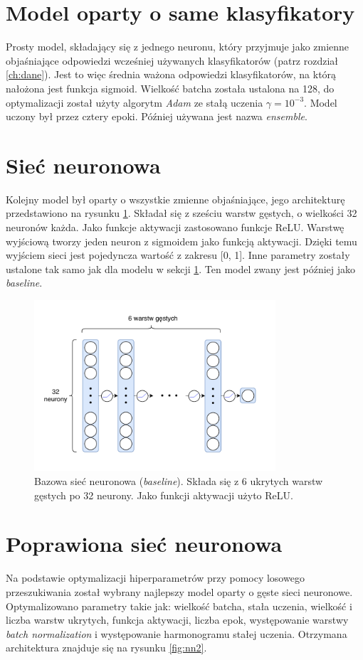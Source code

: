 \documentclass{pracalicmgr}
\begin{document}
	\section{Model oparty o same klasyfikatory}
	\label{sec:mod1}
	Prosty model, składający się z jednego neuronu, który przyjmuje jako zmienne objaśniające odpowiedzi wcześniej używanych klasyfikatorów (patrz rozdział \ref{ch:dane}). Jest to więc średnia ważona odpowiedzi klasyfikatorów, na którą nałożona jest funkcja sigmoid. Wielkość batcha została ustalona na 128, do optymalizacji został użyty algorytm \textit{Adam} ze stałą uczenia $\gamma = 10^{-3}$. Model uczony był przez cztery epoki. Później używana jest nazwa \textit{ensemble}.
	\section{Sieć neuronowa}
	\label{sec:mod2}
	Kolejny model był oparty o wszystkie zmienne objaśniające, jego architekturę przedstawiono na rysunku \ref{fig:nn1}. Składał się z sześciu warstw gęstych, o wielkości 32 neuronów każda. Jako funkcje aktywacji zastosowano funkcje ReLU. Warstwę wyjściową tworzy jeden neuron z sigmoidem jako funkcją aktywacji. Dzięki temu wyjściem sieci jest pojedyncza wartość z zakresu [0, 1]. Inne parametry zostały ustalone tak samo jak dla modelu w sekcji \ref{sec:mod1}. Ten model zwany jest później jako \textit{baseline}.
	\begin{figure}
	\centering
	\includegraphics[width=0.8\textwidth]{neural_net.pdf}
	\caption{Bazowa sieć neuronowa (\textit{baseline}). Składa się z 6 ukrytych warstw gęstych po 32 neurony. Jako funkcji aktywacji użyto ReLU.}
	\label{fig:nn1}
	\end{figure}
	
	\section{Poprawiona sieć neuronowa}
	Na podstawie optymalizacji hiperparametrów przy pomocy losowego przeszukiwania został wybrany najlepszy model oparty o gęste sieci neuronowe. Optymalizowano parametry takie jak: wielkość batcha, stała uczenia, wielkość i liczba warstw ukrytych, funkcja aktywacji, liczba epok, występowanie warstwy \textit{batch normalization} i występowanie harmonogramu stałej uczenia. Otrzymana architektura znajduje się na rysunku \ref{fig:nn2}. 
	
\end{document}
